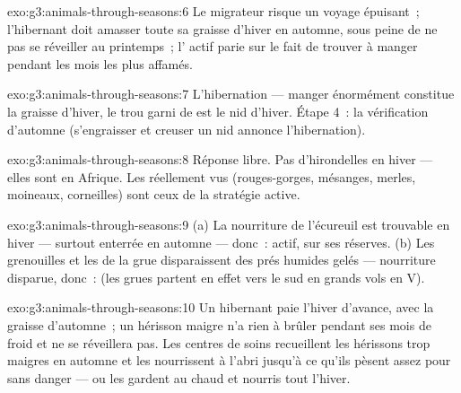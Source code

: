 \begin{solution}{exo:g3:animals-through-seasons:6}
Le migrateur risque un voyage épuisant~; l'hibernant doit amasser
toute sa graisse d'hiver en automne, sous peine de ne pas se
réveiller au printemps~; l' actif parie sur le fait de trouver
à manger pendant les mois les plus affamés.
\end{solution}

\begin{solution}{exo:g3:animals-through-seasons:7}
L'hibernation --- manger énormément constitue la graisse d'hiver, le
trou garni de  est le nid d'hiver. Étape 4~: la vérification
d'automne (s'engraisser et creuser un nid annonce l'hibernation).
\end{solution}

\begin{solution}{exo:g3:animals-through-seasons:8}
Réponse libre. Pas d'hirondelles en hiver --- elles sont en Afrique.
Les  réellement vus (rouges-gorges, mésanges, merles,
moineaux, corneilles) sont ceux de la stratégie active.
\end{solution}

\begin{solution}{exo:g3:animals-through-seasons:9}
(a) La nourriture de l'écureuil est trouvable en hiver --- surtout
enterrée en automne --- donc~: actif, sur ses réserves. (b) Les
grenouilles et les  de la grue disparaissent des prés
humides gelés --- nourriture disparue, donc~:  (les grues
partent en effet vers le sud en grands vols en V).
\end{solution}

\begin{solution}{exo:g3:animals-through-seasons:10}
Un hibernant paie l'hiver d'avance, avec la graisse d'automne~; un
hérisson maigre n'a rien à brûler pendant ses mois de  froid
et ne se réveillera pas. Les centres de soins recueillent les
hérissons trop maigres en automne et les nourrissent à l'abri
jusqu'à ce qu'ils pèsent assez pour  sans danger --- ou les
gardent au chaud et nourris tout l'hiver.
\end{solution}
